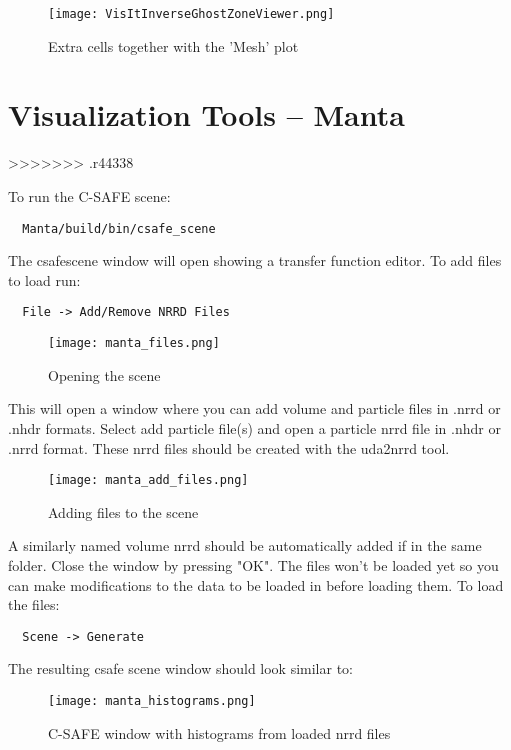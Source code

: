 \begin{figure}
  \center
  \texttt{[image: VisItInverseGhostZoneViewer.png]}
  \caption{Extra cells together with the 'Mesh' plot}
  \label{VisItInverseGhostZoneViewer}
\end{figure}

\chapter{Visualization Tools -- Manta}
>>>>>>> .r44338

To run the C-SAFE scene: 
\begin{Verbatim}
  Manta/build/bin/csafe_scene
\end{Verbatim}

The csafescene window will open showing a transfer function editor.  To add files to load run:
\begin{Verbatim}
  File -> Add/Remove NRRD Files
\end{Verbatim}

\begin{figure}[htbp]
  \center
  \texttt{[image: manta\_files.png]}
  \caption{Opening the scene}
  \label{fig:manta_files}
\end{figure}

This will open a window where you can add volume and particle files in .nrrd or .nhdr formats.  Select add particle file(s) and open a particle nrrd file in .nhdr or .nrrd format.  These nrrd files should be created with the uda2nrrd tool.

\begin{figure}[htbp]
  \center
  \texttt{[image: manta\_add\_files.png]}
  \caption{Adding files to the scene}
  \label{fig:manta_add_files}
\end{figure}

A similarly named volume nrrd should be automatically added if in the same folder.  Close the window by pressing "OK".  The files won't be loaded yet so you can make modifications to the data to be loaded in before loading them.  To load the files:

\begin{Verbatim}
  Scene -> Generate
\end{Verbatim}

The resulting csafe scene window should look similar to:

\begin{figure}[htbp]
  \center
  \texttt{[image: manta\_histograms.png]}
  \caption{C-SAFE window with histograms from loaded nrrd files}
  \label{fig:manta_histograms}
\end{figure}


